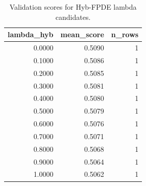 \begin{table}[t]
\caption{Validation scores for Hyb-FPDE lambda candidates.}
\label{tab:lambda_distribution_computed}
\centering
\begin{tabular}{rrr}
\toprule
lambda\_hyb & mean\_score & n\_rows \\
\midrule
0.0000 & 0.5090 & 1 \\
0.1000 & 0.5086 & 1 \\
0.2000 & 0.5085 & 1 \\
0.3000 & 0.5081 & 1 \\
0.4000 & 0.5080 & 1 \\
0.5000 & 0.5079 & 1 \\
0.6000 & 0.5076 & 1 \\
0.7000 & 0.5071 & 1 \\
0.8000 & 0.5068 & 1 \\
0.9000 & 0.5064 & 1 \\
1.0000 & 0.5062 & 1 \\
\bottomrule
\end{tabular}

\end{table}
